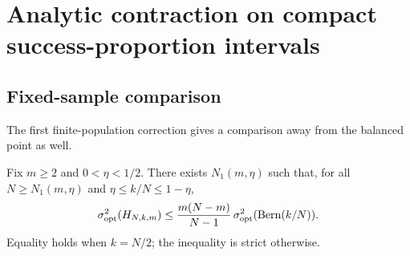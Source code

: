 \section{Analytic contraction on compact success-proportion intervals}\label{app:contraction}
\subsection{Fixed-sample comparison}
The first finite-population correction gives a comparison away from the balanced point as well.

\begin{theorem}\label{thm:compact_contraction}
Fix $m\ge2$ and $0<\eta<1/2$. There exists $N_1(m,\eta)$ such that, for all $N\ge N_1(m,\eta)$ and $\eta\le k/N\le1-\eta$,
\begin{equation}\label{eq:compact_envelope}
 \sigma^2_{\mathrm{opt}}(H_{N,k,m})
 \le\frac{m(N-m)}{N-1}\,
 \sigma^2_{\mathrm{opt}}(\operatorname{Bern}(k/N)).
\end{equation}
Equality holds when $k=N/2$; the inequality is strict otherwise.
\end{theorem}
